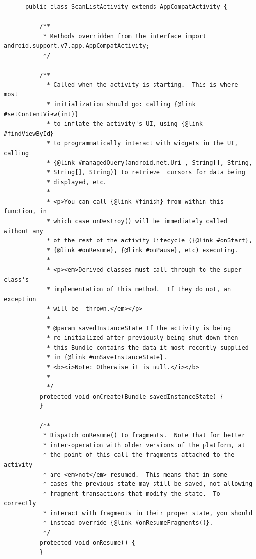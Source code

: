     \begin{lstlisting}
      public class ScanListActivity extends AppCompatActivity {

          /**
           * Methods overridden from the interface import android.support.v7.app.AppCompatActivity;
           */

          /**
            * Called when the activity is starting.  This is where most 
            * initialization should go: calling {@link #setContentView(int)} 
            * to inflate the activity's UI, using {@link #findViewById} 
            * to programmatically interact with widgets in the UI, calling
            * {@link #managedQuery(android.net.Uri , String[], String, 
            * String[], String)} to retrieve  cursors for data being 
            * displayed, etc.
            *
            * <p>You can call {@link #finish} from within this function, in
            * which case onDestroy() will be immediately called without any 
            * of the rest of the activity lifecycle ({@link #onStart}, 
            * {@link #onResume}, {@link #onPause}, etc) executing.
            *
            * <p><em>Derived classes must call through to the super class's
            * implementation of this method.  If they do not, an exception 
            * will be  thrown.</em></p>
            *
            * @param savedInstanceState If the activity is being 
            * re-initialized after previously being shut down then 
            * this Bundle contains the data it most recently supplied 
            * in {@link #onSaveInstanceState}.  
            * <b><i>Note: Otherwise it is null.</i></b>
            *
            */
          protected void onCreate(Bundle savedInstanceState) {
          }

          /**
           * Dispatch onResume() to fragments.  Note that for better 
           * inter-operation with older versions of the platform, at 
           * the point of this call the fragments attached to the activity 
           * are <em>not</em> resumed.  This means that in some 
           * cases the previous state may still be saved, not allowing
           * fragment transactions that modify the state.  To correctly 
           * interact with fragments in their proper state, you should 
           * instead override {@link #onResumeFragments()}.
           */
          protected void onResume() {
          }


\end{lstlisting}

